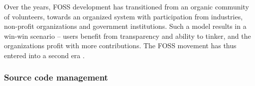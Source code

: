 
Over the years, FOSS development has transitioned from an organic community of
volunteers, towards an organized system with participation from industries,
non-profit organizations and government institutions.
%
Such a model results in a win-win scenario -- users benefit from transparency and
ability to tinker, and the organizations profit with more contributions.
%
The FOSS movement has thus entered into a second era
\citep{fitzgerald_transformation_2006}.









\subsubsection{Source code management}

